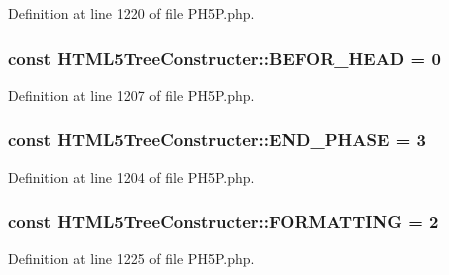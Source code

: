 Definition at line 1220 of file P\+H5\+P.\+php.

\hypertarget{classHTML5TreeConstructer_ab5f3195766fbba1539208145439ce17b}{
\subsubsection[{B\+E\+F\+O\+R\+\_\+\+H\+E\+A\+D}]{\setlength{\rightskip}{0pt plus 5cm}const H\+T\+M\+L5\+Tree\+Constructer\+::\+B\+E\+F\+O\+R\+\_\+\+H\+E\+A\+D = 0}}\label{classHTML5TreeConstructer_ab5f3195766fbba1539208145439ce17b}


Definition at line 1207 of file P\+H5\+P.\+php.

\hypertarget{classHTML5TreeConstructer_a265916a150d9ab06d947eec0d62b3aec}{
\subsubsection[{E\+N\+D\+\_\+\+P\+H\+A\+S\+E}]{\setlength{\rightskip}{0pt plus 5cm}const H\+T\+M\+L5\+Tree\+Constructer\+::\+E\+N\+D\+\_\+\+P\+H\+A\+S\+E = 3}}\label{classHTML5TreeConstructer_a265916a150d9ab06d947eec0d62b3aec}


Definition at line 1204 of file P\+H5\+P.\+php.

\hypertarget{classHTML5TreeConstructer_a11bb5cd773c1da3131fda7655326d498}{
\subsubsection[{F\+O\+R\+M\+A\+T\+T\+I\+N\+G}]{\setlength{\rightskip}{0pt plus 5cm}const H\+T\+M\+L5\+Tree\+Constructer\+::\+F\+O\+R\+M\+A\+T\+T\+I\+N\+G = 2}}\label{classHTML5TreeConstructer_a11bb5cd773c1da3131fda7655326d498}


Definition at line 1225 of file P\+H5\+P.\+php.

